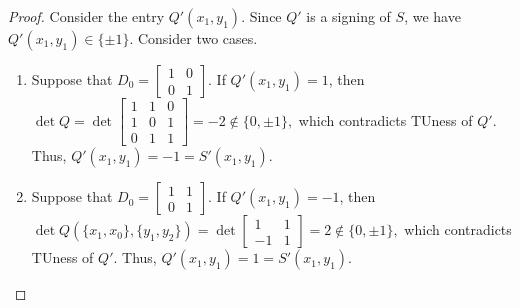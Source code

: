 \begin{proof}
    Consider the entry $Q' (x_{1}, y_{1})$. Since $Q'$ is a signing of $S$, we have $Q' (x_{1}, y_{1}) \in \{\pm 1\}$. Consider two cases.
    \begin{enumerate}
        \item Suppose that $D_{0} = \begin{bmatrix} 1 & 0 \\ 0 & 1 \end{bmatrix}$. If $Q' (x_{1}, y_{1}) = 1$, then
        $
            \det Q = \det \begin{bmatrix}
                1 & 1 & 0 \\
                1 & 0 & 1 \\
                0 & 1 & 1
            \end{bmatrix} = -2 \notin \{0, \pm 1\},
        $
        which contradicts TUness of $Q'$. Thus, $Q' (x_{1}, y_{1}) = -1 = S' (x_{1}, y_{1})$.
        \item Suppose that $D_{0} = \begin{bmatrix} 1 & 1 \\ 0 & 1 \end{bmatrix}$. If $Q' (x_{1}, y_{1}) = -1$, then
        $
            \det Q (\{x_{1}, x_{0}\}, \{y_{1}, y_{2}\}) = \det \begin{bmatrix}
                1 & 1 \\
                -1 & 1
            \end{bmatrix} = 2 \notin \{0, \pm 1\},
        $
        which contradicts TUness of $Q'$. Thus, $Q' (x_{1}, y_{1}) = 1 = S' (x_{1}, y_{1})$.
    \end{enumerate}
\end{proof}


